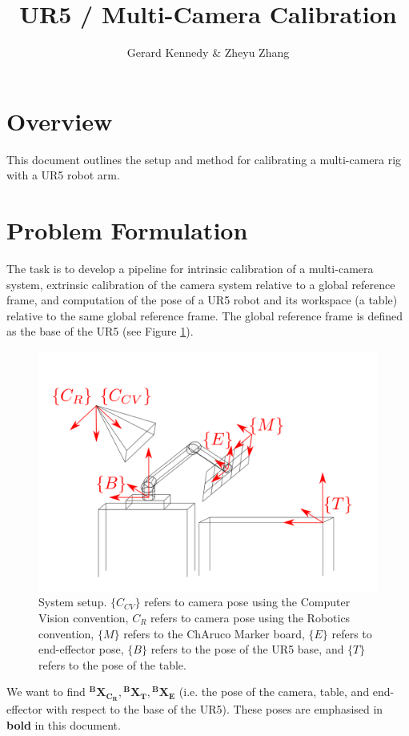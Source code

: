 \documentclass[10pt,a4paper]{article}
\title{\vspace{-1in}UR5 / Multi-Camera Calibration}
\author{Gerard Kennedy \& Zheyu Zhang}
\date{}
\begin{document}
\maketitle
\section{Overview}
This document outlines the setup and method for calibrating a multi-camera rig with a UR5 robot arm. 

\section{Problem Formulation\label{problem}}
The task is to develop a pipeline for intrinsic calibration of a multi-camera system, extrinsic calibration of the camera system relative to a global reference frame, and computation of the pose of a UR5 robot and its workspace (a table) relative to the same global reference frame. The global reference frame is defined as the base of the UR5 (see Figure \ref{fig:setup}).

\begin{figure}[H] \centering
	\includegraphics[width=\textwidth]{ur5calib}
	\caption{System setup. $\{C_{CV}\}$ refers to camera pose using the Computer Vision convention, ${C_R}$ refers to camera pose using the Robotics convention, $\{M\}$ refers to the ChAruco Marker board, $\{E\}$ refers to end-effector pose, $\{B\}$ refers to the pose of the UR5 base, and $\{T\}$ refers to the pose of the table.}
	\label{fig:setup}
\end{figure}

\noindent We want to find $\bm{^BX_{C_R},\mbox{} ^BX_T,\mbox{} ^BX_E}$ (i.e. the pose of the camera, table, and end-effector with respect to the base of the UR5). These poses are emphasised in \textbf{bold} in this document.
\\[2ex]
\end{document}
